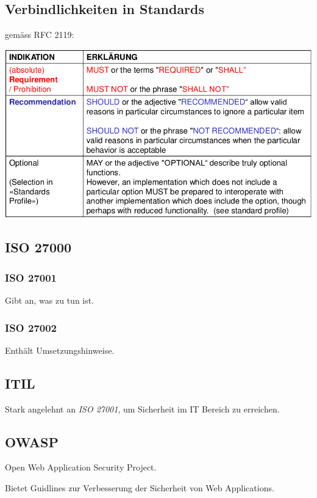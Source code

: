 \subsection{Verbindlichkeiten in Standards}
gemäss RFC 2119:

\includegraphics[scale=0.5]{img/rfc2119.png}
	
\subsection{ISO 27000}

\subsubsection{ISO 27001}
	Gibt an, was zu tun ist.
\subsubsection{ISO 27002}
	Enthält Umsetzungshinweise.

\subsection{ITIL}
	Stark angelehnt an \emph{ISO 27001}, um Sicherheit im IT Bereich zu erreichen.


\subsection{OWASP}	
	Open Web Application Security Project.
	
	Bietet Guidlines zur Verbesserung der Sicherheit von Web Applications.

